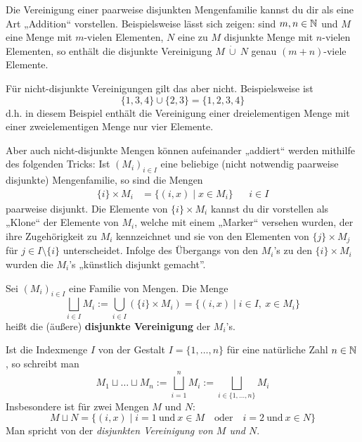 \begin{bem}
    Die Vereinigung einer paarweise disjunkten Mengenfamilie kannst du dir als eine Art „Addition“ vorstellen. Beispielsweise lässt sich zeigen: sind $m,n\in \mathbb N$ und $M$ eine Menge mit $m$-vielen Elementen, $N$ eine zu $M$ disjunkte Menge mit $n$-vielen Elementen, so enthält die disjunkte Vereinigung $M\ \dot\cup\ N$ genau $(m+n)$-viele Elemente.

    Für nicht-disjunkte Vereinigungen gilt das aber nicht. Beispielsweise ist
        \[\{1,3,4\} \cup \{2,3\}= \{1,2,3,4\} \]
    d.h. in diesem Beispiel enthält die Vereinigung einer dreielementigen Menge mit einer zweielementigen Menge nur vier Elemente.

    Aber auch nicht-disjunkte Mengen können aufeinander „addiert“ werden mithilfe des folgenden Tricks: Ist $(M_i)_{i\in I}$ eine beliebige (nicht notwendig paarweise disjunkte) Mengenfamilie, so sind die Mengen
    \begin{align*}
        \{i\}\times M_i &= \{(i,x) \mid x\in M_i\} && i\in I
    \end{align*}
    paarweise disjunkt. Die Elemente von $\{i\}\times M_i$ kannst du dir vorstellen als „Klone“ der Elemente von $M_i$, welche mit einem „Marker“ versehen wurden, der ihre Zugehörigkeit zu $M_i$ kennzeichnet und sie von den Elementen von $\{j\}\times M_j$ für $j\in I\setminus \{i\}$ unterscheidet. Infolge des Übergangs von den $M_i$'s zu den $\{i\}\times M_i$ wurden die $M_i$'s „künstlich disjunkt gemacht”.
\end{bem}


\begin{defin} \label{def:disjunktcup} 
    Sei $(M_i)_{i\in I}$ eine Familie von Mengen. Die Menge
        \[ \bigsqcup_{i\in I} M_i := \bigcup_{i\in I} (\{i\}\times M_i) = \{(i,x) \mid i\in I,\ x\in M_i \}\]
    heißt die (äußere) \textbf{disjunkte Vereinigung} der $M_i$'s.
    
    Ist die Indexmenge $I$ von der Gestalt $I=\{1,\dots , n\}$ für eine natürliche Zahl $n\in \mathbb N$, so schreibt man
        \[ M_1\sqcup\ldots\sqcup M_n := \bigsqcup_{i=1}^n M_i := \bigsqcup_{i\in \{1,\dots , n\}} M_i \]
    Insbesondere ist für zwei Mengen $M$ und $N$:
        \[ M\sqcup N = \{ (i,x)\mid i=1\ \text{und}\ x\in M\quad\text{oder}\quad i=2\ \text{und}\ x\in N\} \]
    Man spricht von der \emph{disjunkten Vereinigung von $M$ und $N$}.
\end{defin}


